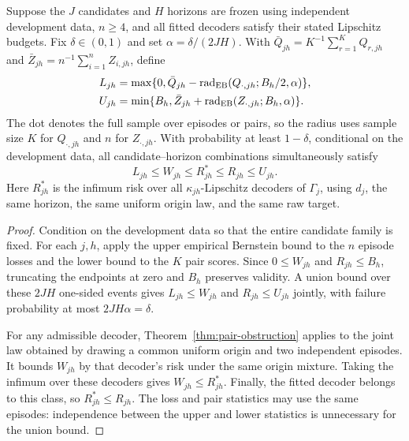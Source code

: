 \begin{theorem}
\label{thm:episode-certificate}
Suppose the $J$ candidates and $H$ horizons are frozen using independent
development data, $n\geq4$, and all fitted decoders satisfy their stated
Lipschitz budgets. Fix $\delta\in(0,1)$ and set
$\alpha=\delta/(2JH)$. With
$\bar Q_{jh}=K^{-1}\sum_{r=1}^KQ_{r,jh}$ and
$\bar Z_{jh}=n^{-1}\sum_{i=1}^nZ_{i,jh}$, define
\begin{align}
 L_{jh}&=\max\{0,\bar Q_{jh}
 -\operatorname{rad}_{\rm EB}(Q_{\cdot,jh};B_h/2,\alpha)\},
 \label{eq:pair-lcb}\\
 U_{jh}&=\min\{B_h,\bar Z_{jh}
 +\operatorname{rad}_{\rm EB}(Z_{\cdot,jh};B_h,\alpha)\}.
 \label{eq:risk-ucb}
\end{align}
The dot denotes the full sample over episodes or pairs, so the radius uses
sample size $K$ for $Q_{\cdot,jh}$ and $n$ for $Z_{\cdot,jh}$. With
probability at least $1-\delta$, conditional on the development data,
all candidate--horizon combinations simultaneously satisfy
\begin{equation}
 L_{jh}\leq W_{jh}\leq R^*_{jh}\leq R_{jh}\leq U_{jh}.
 \label{eq:risk-sandwich}
\end{equation}
Here $R^*_{jh}$ is the infimum risk over all
$\kappa_{jh}$-Lipschitz decoders of $\Gamma_j$, using $d_j$, the same
horizon, the same uniform origin law, and the same raw target.
\end{theorem}

\begin{proof}
Condition on the development data so that the entire candidate family is
fixed. For each $j,h$, apply the upper empirical Bernstein bound to the
$n$ episode losses and the lower bound to the $K$ pair scores. Since
$0\leq W_{jh}$ and $R_{jh}\leq B_h$, truncating the endpoints at zero
and $B_h$ preserves validity. A union bound over these $2JH$ one-sided
events gives $L_{jh}\leq W_{jh}$ and $R_{jh}\leq U_{jh}$ jointly,
with failure probability at most $2JH\alpha=\delta$.

For any admissible decoder, Theorem~\ref{thm:pair-obstruction} applies to
the joint law obtained by drawing a common uniform origin and two
independent episodes. It bounds $W_{jh}$ by that decoder's risk under
the same origin mixture. Taking the infimum over these decoders gives
$W_{jh}\leq R^*_{jh}$. Finally, the fitted decoder belongs to this
class, so $R^*_{jh}\leq R_{jh}$. The loss and pair statistics may use
the same episodes: independence between the upper and lower statistics
is unnecessary for the union bound.
\end{proof}

